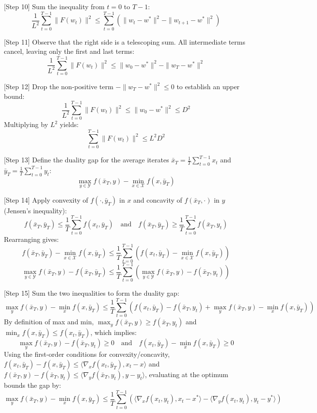 \documentclass{article}
\begin{document}
[Step 10] Sum the inequality from $t=0$ to $T-1$:
$$ \frac{1}{L^2} \sum_{t=0}^{T-1} \|F(w_t)\|^2 \leq \sum_{t=0}^{T-1} \left( \|w_t - w^*\|^2 - \|w_{t+1} - w^*\|^2 \right) $$

[Step 11] Observe that the right side is a telescoping sum. All intermediate terms cancel, leaving only the first and last terms:
$$ \frac{1}{L^2} \sum_{t=0}^{T-1} \|F(w_t)\|^2 \leq \|w_0 - w^*\|^2 - \|w_T - w^*\|^2 $$

[Step 12] Drop the non-positive term $-\|w_T - w^*\|^2 \leq 0$ to establish an upper bound:
$$ \frac{1}{L^2} \sum_{t=0}^{T-1} \|F(w_t)\|^2 \leq \|w_0 - w^*\|^2 \leq D^2 $$
Multiplying by $L^2$ yields:
$$ \sum_{t=0}^{T-1} \|F(w_t)\|^2 \leq L^2 D^2 $$

[Step 13] Define the duality gap for the average iterates $\bar{x}_T = \frac{1}{T} \sum_{t=0}^{T-1} x_t$ and $\bar{y}_T = \frac{1}{T} \sum_{t=0}^{T-1} y_t$:
$$ \max_{y \in \mathcal{Y}} f(\bar{x}_T, y) - \min_{x \in \mathcal{X}} f(x, \bar{y}_T) $$

[Step 14] Apply convexity of $f(\cdot, \bar{y}_T)$ in $x$ and concavity of $f(\bar{x}_T, \cdot)$ in $y$ (Jensen's inequality):
$$ f(\bar{x}_T, \bar{y}_T) \leq \frac{1}{T} \sum_{t=0}^{T-1} f(x_t, \bar{y}_T) \quad \text{and} \quad f(\bar{x}_T, \bar{y}_T) \geq \frac{1}{T} \sum_{t=0}^{T-1} f(\bar{x}_T, y_t) $$
Rearranging gives:
$$ f(\bar{x}_T, \bar{y}_T) - \min_{x \in \mathcal{X}} f(x, \bar{y}_T) \leq \frac{1}{T} \sum_{t=0}^{T-1} \left( f(x_t, \bar{y}_T) - \min_{x \in \mathcal{X}} f(x, \bar{y}_T) \right) $$
$$ \max_{y \in \mathcal{Y}} f(\bar{x}_T, y) - f(\bar{x}_T, \bar{y}_T) \leq \frac{1}{T} \sum_{t=0}^{T-1} \left( \max_{y \in \mathcal{Y}} f(\bar{x}_T, y) - f(\bar{x}_T, y_t) \right) $$

[Step 15] Sum the two inequalities to form the duality gap:
$$ \max_{y} f(\bar{x}_T, y) - \min_{x} f(x, \bar{y}_T) \leq \frac{1}{T} \sum_{t=0}^{T-1} \left( f(x_t, \bar{y}_T) - f(\bar{x}_T, y_t) + \max_{y} f(\bar{x}_T, y) - \min_{x} f(x, \bar{y}_T) \right) $$
By definition of max and min, $\max_y f(\bar{x}_T, y) \geq f(\bar{x}_T, y_t)$ and $\min_x f(x, \bar{y}_T) \leq f(x_t, \bar{y}_T)$, which implies:
$$ \max_y f(\bar{x}_T, y) - f(\bar{x}_T, y_t) \geq 0 \quad \text{and} \quad f(x_t, \bar{y}_T) - \min_x f(x, \bar{y}_T) \geq 0 $$
Using the first-order conditions for convexity/concavity, $f(x_t, \bar{y}_T) - f(x, \bar{y}_T) \leq \langle \nabla_x f(x_t, \bar{y}_T), x_t - x \rangle$ and $f(\bar{x}_T, y) - f(\bar{x}_T, y_t) \leq \langle \nabla_y f(\bar{x}_T, y_t), y - y_t \rangle$, evaluating at the optimum bounds the gap by:
$$ \max_{y} f(\bar{x}_T, y) - \min_{x} f(x, \bar{y}_T) \leq \frac{1}{T} \sum_{t=0}^{T-1} \left( \langle \nabla_x f(x_t, y_t), x_t - x^* \rangle - \langle \nabla_y f(x_t, y_t), y_t - y^* \rangle \right) $$
\end{document}
